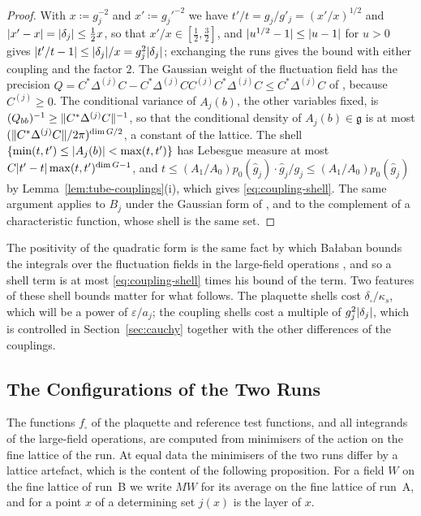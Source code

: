 \documentclass[11pt]{preprint}
\DeclarePairedDelimiter{\abs}{\lvert}{\rvert}
\DeclarePairedDelimiter{\norm}{\lVert}{\rVert}
\numberwithin{equation}{section}
\theoremstyle{definition}
\theoremstyle{remark}
\theoremstyle{plain}
\begin{document}
\begin{proof}
With $x \coloneqq g_j^{-2}$ and $x' \coloneqq g_j'^{-2}$ we have $t'/t = g_j/g'_j = (x'/x)^{1/2}$ and $\abs{x' - x} = \abs{\delta_j} \leq \frac12x$, so that $x'/x \in [\frac12, \frac32]$, and $\abs{u^{1/2} - 1} \leq \abs{u - 1}$ for $u > 0$ gives $\abs{t'/t - 1} \leq \abs{\delta_j}/x = g_j^2\abs{\delta_j}$; exchanging the runs gives the bound with either coupling and the factor $2$. The Gaussian weight of the fluctuation field has the precision $Q = C^*\Delta^{(j)}C - C^*\Delta^{(j)}CC^{(j)}C^*\Delta^{(j)}C \leq C^*\Delta^{(j)}C$ of \cite[(2.21), p.~258]{BalabanCRE}, because $C^{(j)} \geq 0$. The conditional variance of $A_j(b)$, the other variables fixed, is $(Q_{bb})^{-1} \geq \norm{C^*\Delta^{(j)}C}^{-1}$, so that the conditional density of $A_j(b) \in \mathfrak g$ is at most $(\norm{C^*\Delta^{(j)}C}/2\pi)^{\dim G/2}$, a constant of the lattice. The shell $\{ \min(t, t') \leq \abs{A_j(b)} < \max(t, t') \}$ has Lebesgue measure at most $C\abs{t' - t}\max(t, t')^{\dim G - 1}$, and $t \leq (A_1/A_0)p_0(\hat g_j)\cdot\hat g_j/g_j \leq (A_1/A_0)p_0(\hat g_j)$ by Lemma~\ref{lem:tube-couplings}(i), which gives \eqref{eq:coupling-shell}. The same argument applies to $B_j$ under the Gaussian form of \cite[p.~188]{BalabanLFR1}, and to the complement of a characteristic function, whose shell is the same set.
\end{proof}

The positivity of the quadratic form is the same fact by which Ba{\l}aban bounds the integrals over the fluctuation fields in the large-field operations \cite[p.~383]{BalabanLFR2}, and so a shell term is at most \eqref{eq:coupling-shell} times his bound of the term. Two features of these shell bounds matter for what follows. The plaquette shells cost $\delta_\square/\kappa_s$, which will be a power of $\varepsilon/a_j$; the coupling shells cost a multiple of $g_j^2\abs{\delta_j}$, which is controlled in Section~\ref{sec:cauchy} together with the other differences of the couplings.

\subsection{The Configurations of the Two Runs}\label{sec:configurations}

The functions $f_\square$ of the plaquette and reference test functions, and all integrands of the large-field operations, are computed from minimisers of the action on the fine lattice of the run. At equal data the minimisers of the two runs differ by a lattice artefact, which is the content of the following proposition. For a field $W$ on the fine lattice of run~B we write $MW$ for its average on the fine lattice of run~A, and for a point $x$ of a determining set $j(x)$ is the layer of $x$.
\end{document}
